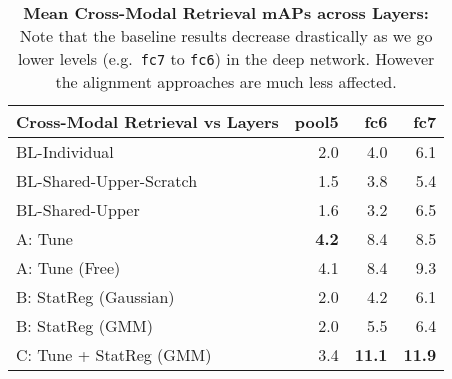 \documentclass[10pt,journal,compsoc]{IEEEtran}
\begin{document}
    \begin{table}[t!]
        \begin{center}
        	\setlength{\tabcolsep}{.2em}
        		\bgroup
        		\def\arraystretch{1.3}%
        		        \scriptsize\begin{tabular}{|l|r r r|}
        \hline
        Cross-Modal Retrieval vs Layers & { pool5}  & {fc6}  & { fc7}  \\ 
         \hline{ BL-Individual }  & 2.0 & 4.0 & 6.1 \\ 
         { BL-Shared-Upper-Scratch }& 1.5 & 3.8 & 5.4 \\
         { BL-Shared-Upper }  & 1.6 & 3.2 & 6.5 \\ 
        \hline{ A: Tune }  & \bf{4.2} & 8.4 & 8.5 \\ 
        { A: Tune (Free) }  &  4.1 & 8.4 & 9.3 \\ 
         { B: StatReg (Gaussian)}  & 2.0 & 4.2 & 6.1 \\ 
         { B: StatReg (GMM) }  & 2.0 & 5.5 & 6.4 \\ 
         { C: Tune + StatReg (GMM) }  & 3.4 & \bf{11.1} & \bf{11.9} \\ 
        \hline
        \end{tabular}
        	\egroup
        \end{center}
        \caption{ {\bf Mean Cross-Modal Retrieval mAPs across Layers:} 
        Note that the baseline results decrease drastically as we go lower levels (e.g.\ \texttt{fc7} to \texttt{fc6}) in the deep network. However the alignment approaches are much less affected.}
        \label{table:cmr_across_layers}
    \end{table}
\end{document}
